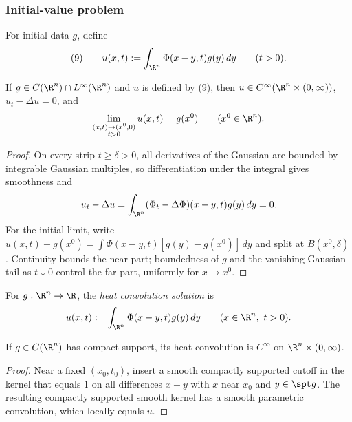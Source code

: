 \subsubsection{Initial-value problem}
\label{sec:heat-initial-value-problem}

For initial data $g$, define
$$(9)\qquad
u(x,t):=\int_{\R^n}\Phi(x-y,t)g(y)\,dy
\qquad(t>0).$$

\begin{theorem}
\label{thm:heat-equation-initial-value-solution}
If $g\in C(\R^n)\cap L^\infty(\R^n)$ and $u$ is defined by (9), then
$u\in C^\infty(\R^n\times(0,\infty))$, $u_t-\Delta u=0$, and
$$\lim_{\substack{(x,t)\to(x^0,0)\\t>0}}u(x,t)=g(x^0)
\qquad(x^0\in\R^n).$$
\end{theorem}
\begin{proof}
\sketch On every strip $t\ge\delta>0$, all derivatives of the Gaussian are
bounded by integrable Gaussian multiples, so differentiation under the
integral gives smoothness and
$$u_t-\Delta u=\int_{\R^n}(\Phi_t-\Delta\Phi)(x-y,t)g(y)\,dy=0.$$
For the initial limit, write
$u(x,t)-g(x^0)=\int\Phi(x-y,t)[g(y)-g(x^0)]\,dy$ and split at
$B(x^0,\delta)$. Continuity bounds the near part; boundedness of $g$ and the
vanishing Gaussian tail as $t\downarrow0$ control the far part, uniformly for
$x\to x^0$.
\end{proof}

\begin{definition}
\label{def:heat-convolution-solution}
\leanok
For $g:\R^n\to\R$, the \emph{heat convolution solution} is
$$u(x,t):=\int_{\R^n}\Phi(x-y,t)g(y)\,dy
\qquad(x\in\R^n,\ t>0).$$
\end{definition}

\begin{lemma}
\label{lem:heat-convolution-smooth}
\leanok
If $g\in C(\R^n)$ has compact support, its heat convolution is
$C^\infty$ on $\R^n\times(0,\infty)$.
\end{lemma}
\begin{proof}
\leanok
\sketch Near a fixed $(x_0,t_0)$, insert a smooth compactly supported cutoff
in the kernel that equals $1$ on all differences $x-y$ with $x$ near $x_0$
and $y\in\spt g$. The resulting compactly supported smooth kernel has a smooth
parametric convolution, which locally equals $u$.
\end{proof}

